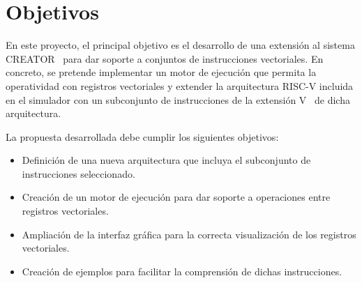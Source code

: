 \section{Objetivos}\label{sec:objectives}
En este proyecto, el principal objetivo es el desarrollo de una extensión al sistema CREATOR~\cite{camarmas2024creator} para dar soporte a conjuntos de instrucciones vectoriales. En concreto, se pretende implementar un motor de ejecución que permita la operatividad con registros vectoriales y extender la arquitectura RISC-V incluida en el simulador con un subconjunto de instrucciones de la extensión V~\cite{vec-riscv} de dicha arquitectura.

La propuesta desarrollada debe cumplir los siguientes objetivos:
\begin{itemize}
    \item Definición de una nueva arquitectura que incluya el subconjunto de instrucciones seleccionado.
    \item Creación de un motor de ejecución para dar soporte a operaciones entre registros vectoriales.
    \item Ampliación de la interfaz gráfica para la correcta visualización de los registros vectoriales.
    \item Creación de ejemplos para facilitar la comprensión de dichas instrucciones.
\end{itemize}

